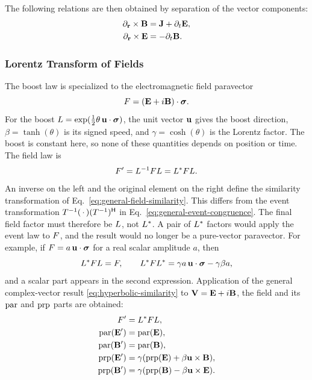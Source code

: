The following relations are then obtained by separation of the vector components:
\begin{align*}
\partial_{\mathbf{r}} \times \mathbf{B} &= \mathbf{J} + \partial _{t} \mathbf{E}, \\
\partial_{\mathbf{r}} \times \mathbf{E} &= -\partial _{t} \mathbf{B}.
\end{align*}

\subsubsection{Lorentz Transform of Fields}
The boost law is specialized to the electromagnetic field paravector
\begin{equation*}
F=(\mathbf{E}+i\mathbf{B})\cdot\mathbf{\bm{\sigma}} .
\end{equation*}
For the boost
\(L=\exp(\tfrac12\theta\,\mathbf{u}\cdot\mathbf{\bm{\sigma}})\), the unit vector
\(\mathbf{u}\) gives the boost direction, \(\beta=\tanh(\theta)\) is its
signed speed, and \(\gamma=\cosh(\theta)\) is the Lorentz factor. The boost
is constant here, so none of these quantities depends on position or time.
The field law is
\[
F'=L^{-1}FL=L^{*}FL.
\]
An inverse on the left and the original element on the right define the
similarity transformation of Eq.\ \eqref{eq:general-field-similarity}.
This differs from the event transformation
\(T^{-1}(\,\cdot\,)(T^{-1})^{\mathsf H}\) in
Eq.\ \eqref{eq:general-event-congruence}. The final field factor must
therefore be \(L\), not \(L^{*}\). A pair of
\(L^{*}\) factors would apply the event law to \(F\), and the
result would no longer be a pure-vector paravector. For example, if
\(F=a\,\mathbf{u}\cdot\mathbf{\bm{\sigma}}\) for a real scalar amplitude \(a\), then
\[
L^{*}FL=F,
\qquad
L^{*}FL^{*}
=\gamma a\,\mathbf{u}\cdot\mathbf{\bm{\sigma}}-\gamma\beta a,
\]
and a scalar part appears in the second expression. Application of the
general complex-vector result
\eqref{eq:hyperbolic-similarity} to
\(\mathbf{V}=\mathbf{E}+i\mathbf{B}\), the field and its
\(\operatorname{par}\) and \(\operatorname{prp}\) parts are obtained:
\begin{align*}
F' &= L^{*}FL, \\
\operatorname{par}( \mathbf{E} ' ) &= \operatorname{par}( \mathbf{E} ), \\
\operatorname{par}( \mathbf{B} ' ) &= \operatorname{par}( \mathbf{B} ), \\
\operatorname{prp}( \mathbf{E} ' ) &= \gamma ( \operatorname{prp}( \mathbf{E} ) + \beta \mathbf{u} \times \mathbf{B} ), \\
\operatorname{prp}( \mathbf{B} ') &= \gamma ( \operatorname{prp}( \mathbf{B} ) - \beta \mathbf{u} \times \mathbf{E} ).
\end{align*}
